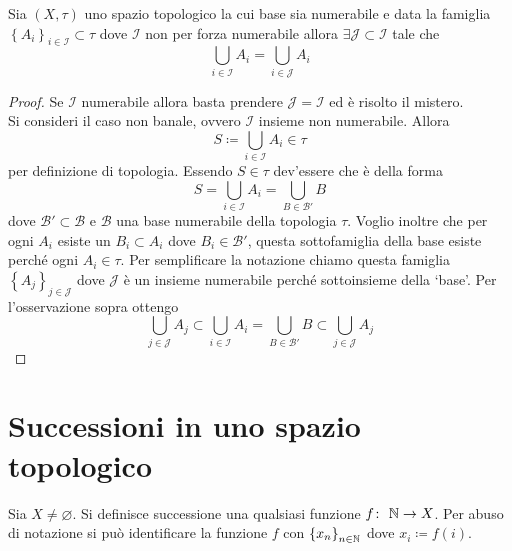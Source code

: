 \begin{theorem}
	Sia $(X,\tau)$ uno spazio topologico la cui base sia numerabile e data la famiglia $\left\{A_i\right\}_{i\in \mathcal{I}} \subset \tau$ dove $\mathcal{I}$ non per forza numerabile allora $\exists \mathcal{J} \subset \mathcal{I}$ tale che 
	\begin{equation*}
		\bigcup_{i \in \mathcal{I}} A_i = \bigcup_{i \in \mathcal{J}} A_i
	\end{equation*}
\end{theorem}
\begin{proof}
	Se $\mathcal{I}$ numerabile allora basta prendere $\mathcal{J} = \mathcal{I}$ ed è risolto il mistero.\\
	Si consideri il caso non banale, ovvero $\mathcal{I}$ insieme non numerabile. Allora 
	\begin{equation*}
		S \coloneqq \bigcup_{i \in \mathcal{I}} A_i \in \tau
	\end{equation*}
	per definizione di topologia. Essendo $S \in \tau$ dev'essere che è della forma
	\begin{equation*}
		S = \bigcup_{i \in \mathcal{I}} A_i = \bigcup_{B \in \mathcal{B}'} B
	\end{equation*}
	dove $\mathcal{B}' \subset \mathcal{B}$ e $\mathcal{B}$ una base numerabile della topologia $\tau$. Voglio inoltre che per ogni $A_i$ esiste un $B_i \subset A_i$ dove $B_i \in \mathcal{B}'$, questa sottofamiglia della base esiste perché ogni $A_i \in \tau$. Per semplificare la notazione chiamo questa famiglia $\left\{A_j\right\}_{j \in \mathcal{J}}$ dove $\mathcal{J}$ è un insieme numerabile perché sottoinsieme della `base'. Per l'osservazione sopra ottengo
	\begin{equation*}
		\bigcup_{j \in \mathcal{J}}  A_j \subset \bigcup_{i \in \mathcal{I}} A_i = \bigcup_{B \in \mathcal{B}'} B \subset \bigcup_{j \in \mathcal{J}}  A_j
	\end{equation*}
\end{proof}

\section{Successioni in uno spazio topologico}

\begin{definition}
	Sia $X \neq \varnothing$. Si definisce successione una qualsiasi funzione $f \colon\ \mathbb{N} \rightarrow X$. Per abuso di notazione si può identificare la funzione $f$ con $\left\{x_n\right\}_{n\in\mathbb{N}}$ dove $x_i \coloneqq f(i)$.
\end{definition}

